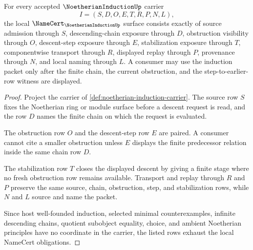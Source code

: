 \begin{theorem}
\label{thm:noetherian-induction-namecert-obligations}
For every accepted $\NoetherianInductionUp$ carrier
$$
I=(S,D,O,E,T,R,P,N,L),
$$
the local $\NameCert_{\NoetherianInductionUp}$ surface consists exactly of source admission through $S$, descending-chain exposure through $D$, obstruction visibility through $O$, descent-step exposure through $E$, stabilization exposure through $T$, componentwise transport through $R$, displayed replay through $P$, provenance through $N$, and local naming through $L$. A consumer may use the induction packet only after the finite chain, the current obstruction, and the step-to-earlier-row witness are displayed.
\end{theorem}
\begin{proof}
Project the carrier of \autoref{def:noetherian-induction-carrier}. The source row $S$ fixes the Noetherian ring or module surface before a descent request is read, and the row $D$ names the finite chain on which the request is evaluated.

The obstruction row $O$ and the descent-step row $E$ are paired. A consumer cannot cite a smaller obstruction unless $E$ displays the finite predecessor relation inside the same chain row $D$.

The stabilization row $T$ closes the displayed descent by giving a finite stage where no fresh obstruction row remains available. Transport and replay through $R$ and $P$ preserve the same source, chain, obstruction, step, and stabilization rows, while $N$ and $L$ source and name the packet.

Since host well-founded induction, selected minimal counterexamples, infinite descending chains, quotient subobject equality, choice, and ambient Noetherian principles have no coordinate in the carrier, the listed rows exhaust the local NameCert obligations.
\end{proof}

